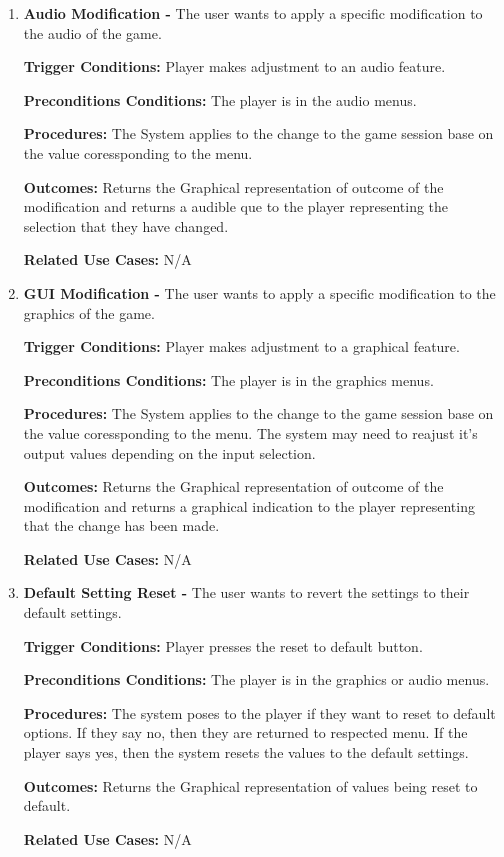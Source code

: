 \documentclass{article}
\begin{document}
\begin{enumerate}[{PUC}1. ]
	\item \textbf{Audio Modification -} The user wants to apply a specific modification to the audio of the game.\par
\textbf{Trigger Conditions: }Player makes adjustment to an audio feature. \par
\textbf{Preconditions Conditions: }The player is in the audio menus. \par
\textbf{Procedures: }The System applies to the change to the game session base on the value coressponding to the menu. \par
\textbf{Outcomes: }Returns the Graphical representation of outcome of the modification and returns a audible que to the player representing the selection that they have changed. \par
\textbf{Related Use Cases: }N/A \par

	\item \textbf{GUI Modification -} The user wants to apply a specific modification to the graphics of the game.\par
\textbf{Trigger Conditions: }Player makes adjustment to a graphical feature. \par
\textbf{Preconditions Conditions: }The player is in the graphics menus. \par
\textbf{Procedures: }The System applies to the change to the game session base on the value coressponding to the menu. The system may need to reajust it's output values depending on the input selection. \par
\textbf{Outcomes: }Returns the Graphical representation of outcome of the modification and returns a graphical indication to the player representing that the change has been made. \par
\textbf{Related Use Cases: }N/A \par

	\item \textbf{Default Setting Reset -} The user wants to revert the settings to their default settings.\par
\textbf{Trigger Conditions: }Player presses the reset to default button. \par
\textbf{Preconditions Conditions: }The player is in the graphics or audio menus. \par
\textbf{Procedures: }The system poses to the player if they want to reset to default options. If they say no, then they are returned to respected menu. If the player says yes, then the system resets the values to the default settings. \par
\textbf{Outcomes: }Returns the Graphical representation of values being reset to default. \par
\textbf{Related Use Cases: }N/A \par
	

\end{enumerate}
\end{document}

